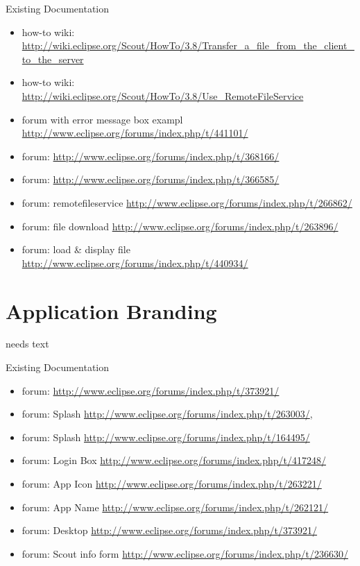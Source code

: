 \documentclass[a4paper,10pt,twoside]{book}
\begin{document}
\noindent Existing Documentation
\begin{itemize}
  \item how-to wiki: \url{http://wiki.eclipse.org/Scout/HowTo/3.8/Transfer_a_file_from_the_client_to_the_server}
  \item how-to wiki: \url{http://wiki.eclipse.org/Scout/HowTo/3.8/Use_RemoteFileService}
  \item forum with error message box exampl \url{http://www.eclipse.org/forums/index.php/t/441101/}
  \item forum: \url{http://www.eclipse.org/forums/index.php/t/368166/}
  \item forum: \url{http://www.eclipse.org/forums/index.php/t/366585/}
  \item forum: remotefileservice \url{http://www.eclipse.org/forums/index.php/t/266862/}
  \item forum: file download \url{http://www.eclipse.org/forums/index.php/t/263896/}
  \item forum: load \& display file \url{http://www.eclipse.org/forums/index.php/t/440934/}
\end{itemize}

\chapter{Application Branding}
needs text

\noindent Existing Documentation
\begin{itemize}
  \item forum: \url{http://www.eclipse.org/forums/index.php/t/373921/}
  \item forum: Splash \url{http://www.eclipse.org/forums/index.php/t/263003/}, 
  \item forum: Splash \url{http://www.eclipse.org/forums/index.php/t/164495/}
  \item forum: Login Box \url{http://www.eclipse.org/forums/index.php/t/417248/}
  \item forum: App Icon \url{http://www.eclipse.org/forums/index.php/t/263221/}
  \item forum: App Name \url{http://www.eclipse.org/forums/index.php/t/262121/}
  \item forum: Desktop \url{http://www.eclipse.org/forums/index.php/t/373921/}
  \item forum: Scout info form \url{http://www.eclipse.org/forums/index.php/t/236630/}
\end{itemize}
\end{document}
